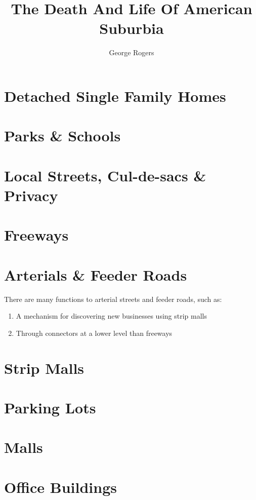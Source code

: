 \documentclass[letterpaper]{amsbook}
\title{The Death And Life Of American Suburbia}
\author{George Rogers}
\begin{document}
\maketitle
\tableofcontents
\chapter{Detached Single Family Homes}
\chapter{Parks \& Schools}
\chapter{Local Streets, Cul-de-sacs \& Privacy}
\chapter{Freeways}
\chapter{Arterials \& Feeder Roads}
There are many functions to arterial streets and feeder roads, such as:
\begin{enumerate}
    \item A mechanism for discovering new businesses using strip malls
    \item Through connectors at a lower level than freeways
\end{enumerate}
\chapter{Strip Malls}
\chapter{Parking Lots}
\chapter{Malls}
\chapter{Office Buildings}
\end{document}
